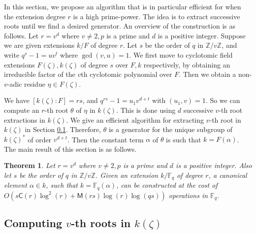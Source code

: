 \documentclass[12pt]{article}
\theoremstyle{plain}
\newtheorem{theorem}{Theorem}
\theoremstyle{definition}
\def\Z{\ensuremath{\mathbb{Z}}}
\def\F{\ensuremath{\mathbb{F}}}
\def\MM{\ensuremath{\mathsf{M}}}
\def\CC{\ensuremath{\mathsf{C}}}
\newcounter{algorithm}
\begin{document}
In this section, we propose an algorithm that is in particular efficient for when the extension 
degree $r$ is a high prime-power.
The idea is to extract successive roots until we find a desired 
generator. An overview of the construction is 
as follows. Let $r = v^d$ where $v \ne 2, p$ is a prime and $d$ is a positive integer. Suppose we 
are given extensions $k/F$ of degree $r$. Let $s$ be the order of $q$ in $\Z / v\Z$, 
and write $q^s - 1 = uv^t$ where $\gcd(v, u) = 1$. We first move to cyclotomic field extensions 
$F(\zeta), k(\zeta)$ of degree $s$ over $F, k$ respectively, by obtaining an irreducible factor of 
the $v$th cyclotomic polynomial over $F$. Then we obtain a  non-$v$-adic residue $\eta \in 
F(\zeta)$. 

We have $[k(\zeta): F] = rs$, and $q^{rs} - 1 = u_1v^{d + t}$ with $(u_1, v) = 1$. So we can 
compute an $r$-th root $\theta$ of $\eta$ in $k(\zeta)$. This is done using $d$ successive $v$-th 
root extractions in $k(\zeta)$. We give an efficient algorithm for extracting $v$-th root in 
$k(\zeta)$ in Section \ref{subsec:vthroot}. Therefore, $\theta$ is a generator 
for the unique subgroup of $k(\zeta)^*$ of order $v^{d + t}$. Then the constant term $\alpha$ of 
$\theta$ is such that $k = F(\alpha)$. The main result of this section is as follows.
\begin{theorem}
	\label{theorem:isom-root}
	Let $r = v^d$ where $v \ne 2, p$ is a prime and $d$ is a positive integer. Also let $s$ be the 
	order of $q$ in $\Z / v\Z$. Given an extension $k/\F_q$ of degree $r$, a canonical element 
	$\alpha \in k$, such that $k = \F_q(\alpha)$, can be constructed at the cost of 
	$O(s\CC(r)\log^2(r) + \MM(rs)\log(r)\log(qs))$ operations in $\F_q$.
\end{theorem}



\subsection{Computing $v$-th roots in $k(\zeta)$}
\label{subsec:vthroot}
\end{document}

